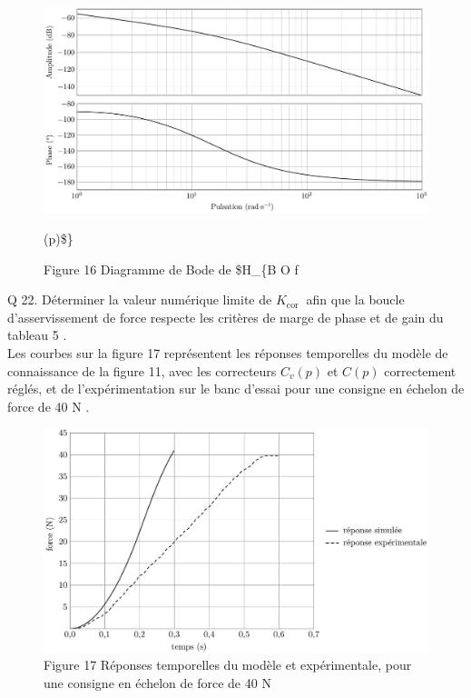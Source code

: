 \documentclass[10pt]{article}
\begin{document}
\begin{figure}[h]
\begin{center}
  \includegraphics[width=\textwidth]{2025_09_16_5f2d7643f7e649c6833dg-12(1)}
\captionsetup{labelformat=empty}
\caption{Figure 16 Diagramme de Bode de \$H\_\{B O f}(p)\$\}\end{center}
\end{figure}

Q 22. Déterminer la valeur numérique limite de $K_{\text {cor }}$ afin que la boucle d'asservissement de force respecte les critères de marge de phase et de gain du tableau 5 .\\
Les courbes sur la figure 17 représentent les réponses temporelles du modèle de connaissance de la figure 11, avec les correcteurs $C_{v}(p)$ et $C(p)$ correctement réglés, et de l'expérimentation sur le banc d'essai pour une consigne en échelon de force de 40 N .

\begin{figure}[h]
\begin{center}
  \includegraphics[width=\textwidth]{2025_09_16_5f2d7643f7e649c6833dg-12}
\captionsetup{labelformat=empty}
\caption{Figure 17 Réponses temporelles du modèle et expérimentale, pour une consigne en échelon de force de 40 N}
\end{center}
\end{figure}
\end{document}
